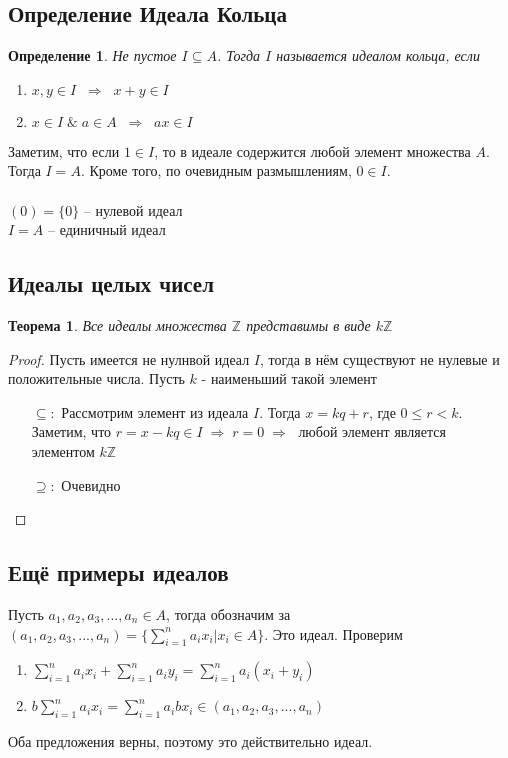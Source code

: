 \documentclass[12pt, a4paper]{article}
\newcommand{\ra}{\;\Rightarrow\;}
\newcommand{\Z}{\mathds{Z}}
\newcommand{\m}{\leqslant}
\theoremstyle{plain}
\newtheorem*{Th*}{Теорема}
\newtheorem{Def}{Определение}
\theoremstyle{definition}
\begin{document}
\subsection*{Определение Идеала Кольца}
\begin{Def}
    Не пустое $I\subseteq A$. Тогда $I$ называется идеалом кольца, если 
    \begin{enumerate}
        \item $x,y \in I\; \ra\; x+y \in I$
        \item $x \in I \; \&\; a\in A\; \ra \; ax\in I$
    \end{enumerate} 

\end{Def}
Заметим, что если $1\in I$, то в идеале содержится любой элемент множества $A$. Тогда $I = A$.
Кроме того, по очевидным размышлениям, $0\in I$.\\\\
$(0) = \{0\}$ -- нулевой идеал\\
$I = A$ -- единичный идеал
\subsection*{Идеалы целых чисел}
\begin{Th*}
Все идеалы множества $\Z$ представимы в виде $k\Z$
\end{Th*}
\begin{proof}
    Пусть имеется не нулнвой идеал $I$, тогда в нём существуют не нулевые и положительные числа. Пусть $k$ - наименьший такой элемент
    \begin{enumerate}
        \item[$\subseteq:$] Рассмотрим элемент из идеала $I$. Тогда $x=kq+r$, где $0\m r<k$. Заметим, что $r = x-kq\in I\ra r =0\ra$ любой элемент является элементом $k\Z$
        \item[$\supseteq:$] Очевидно 
    \end{enumerate}

\end{proof}
\subsection*{Ещё примеры идеалов}
Пусть $a_1,a_2,a_3,...,a_n \in A$, тогда обозначим за $(a_1,a_2,a_3,...,a_n) = \{\sum\limits_{i = 1}^na_ix_i|x_i\in A\}$. Это идеал. Проверим
\begin{enumerate}
    \item $\sum\limits_{i = 1}^na_ix_i + \sum\limits_{i = 1}^n a_iy_i = \sum\limits_{i=1}^n a_i(x_i+y_i)$
    \item $b\sum\limits_{i=1}^na_ix_i = \sum\limits_{i=1}^na_ibx_i \in (a_1,a_2,a_3,...,a_n)$
\end{enumerate}
Оба предложения верны, поэтому это действительно идеал.
\hypertarget{p2}{}
\end{document}
